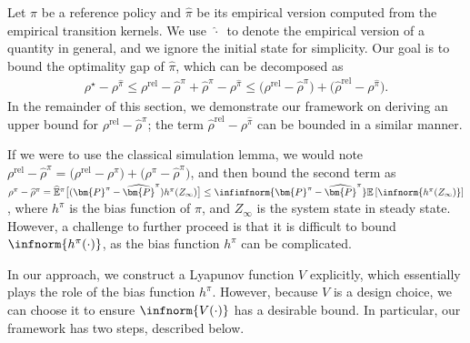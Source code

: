 \documentclass[mnsc,nonblindrev]{informs3}
\newcommand{\E}{\mathbb{E}}
\newcommand{\bp}{\bm{P}}
\newcommand{\bphat}{\widehat{\bm{P}}}
\newcommand{\rhohat}{\widehat{\rho}}
\newcommand{\pihat}{\widehat{\pi}}
\newcommand{\rhorel}{\rho^{\mathrm{rel}}}
\begin{document}
Let $\pi$ be a reference policy and $\pihat$ be its empirical version computed from the empirical transition kernels.
We use $\,\widehat{\cdot}\,$ to denote the empirical version of a quantity in general, and we ignore the initial state for simplicity.
Our goal is to bound the optimality gap of $\pihat$, which can be decomposed as 
\begin{equation}
\label{eq:decomp}
\begin{aligned}
    \rho^{\star}  - \rho^{\pihat} 
    \le \rho^{\mathrm{rel}} - \widehat{\rho}^{\pi}  + \widehat{\rho}^{\pi}  - \rho^{\pihat} 
    \le \bigl(\rho^{\mathrm{rel}} - \widehat{\rho}^{\pi}\bigr)  + \bigl(\widehat{\rho}^{\mathrm{rel}} - \rho^{\pihat}\bigr).
\end{aligned}
\end{equation}
In the remainder of this section, we demonstrate our framework on deriving an upper bound for $\rho^{\mathrm{rel}} - \widehat{\rho}^{\pi}$; the term $\widehat{\rho}^{\mathrm{rel}} - \rho^{\pihat} $ can be bounded in a similar manner. 

If we were to use the classical simulation lemma, we would note $\rhorel-\rhohat^{\pi} =\bigl(\rhorel-\rho^{\pi}\bigr) + \bigl(\rho^{\pi} -\rhohat^{\pi}\bigr)$, and then bound the second term as
$\rho^{\pi} -\rhohat^{\pi}= \widehat{\E}^{\pi} \big[(\bp^{\pi}-\bphat^{\pi})h^{\pi}(Z_\infty) \big]
\le \infinfnorm{\bp^{\pi}-\bphat^{\pi}} \E\left[\infnorm{h^{\pi}(Z_\infty)}\right]$, where $h^{\pi}$ is the bias function of $\pi$, and $Z_{\infty}$ is the system state in steady state.
However, a challenge to further proceed is that it is difficult to bound $\infnorm{h^{\pi}(\cdot)}$, as the bias function $h^{\pi}$ can be complicated.


In our approach, we construct a Lyapunov function $V$ explicitly, which essentially plays the role of the bias function $h^{\pi}$.
However, because $V$ is a design choice, we can choose it to ensure $\infnorm{V(\cdot)}$ has a desirable bound.
In particular, our framework has two steps, described below.
\end{document}

